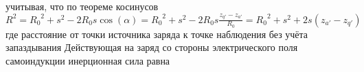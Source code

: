 \documentclass{article}
\begin{document}
учитывая, что по теореме косинусов
${{R}^{2}}={{R}_{0}}^{2}+{{s}^{2}}-2{{R}_{0}}s\cos \left( \alpha  \right)={{R}_{0}}^{2}+{{s}^{2}}-2{{R}_{0}}s\frac{{{z}_{q'}}-{{z}_{a'}}}{{{R}_{0}}}={{R}_{0}}^{2}+{{s}^{2}}+2s\left( {{z}_{a'}}-{{z}_{q'}} \right)$ 
где  расстояние от точки источника заряда к точке наблюдения без учёта запаздывания
Действующая на заряд со стороны электрического поля самоиндукции инерционная сила равна
\end{document}
